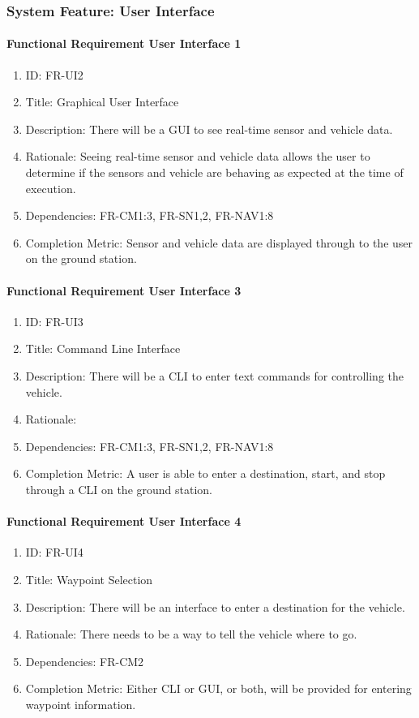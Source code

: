 \documentclass[compsoc,draftclsnofoot,onecolumn,10pt]{IEEEtran}
\begin{document}
\subsubsection{System Feature: User Interface}

	\paragraph{Functional Requirement User Interface 1}
		\begin{enumerate}
			\item ID: FR-UI2
			\item Title: Graphical User Interface
			\item Description: There will be a GUI to see real-time sensor and vehicle data.
			\item Rationale: Seeing real-time sensor and vehicle data allows the user to determine if the sensors and vehicle are behaving as expected at the time of execution.
			\item Dependencies: FR-CM1:3, FR-SN1,2, FR-NAV1:8
			\item Completion Metric: Sensor and vehicle data are displayed through to the user on the ground station.
		\end{enumerate}

	\paragraph{Functional Requirement User Interface 3}
		\begin{enumerate}
			\item ID: FR-UI3
			\item Title: Command Line Interface
			\item Description: There will be a CLI to enter text commands for controlling the vehicle.
			\item Rationale: 
			\item Dependencies: FR-CM1:3, FR-SN1,2, FR-NAV1:8
			\item Completion Metric: A user is able to enter a destination, start, and stop through a CLI on the ground station.
		\end{enumerate}

	\paragraph{Functional Requirement User Interface 4}
		\begin{enumerate}
			\item ID: FR-UI4
			\item Title: Waypoint Selection
			\item Description: There will be an interface to enter a destination for the vehicle.
			\item Rationale: There needs to be a way to tell the vehicle where to go.
			\item Dependencies: FR-CM2
			\item Completion Metric: Either CLI or GUI, or both, will be provided for entering waypoint information.
		\end{enumerate}
\end{document}
